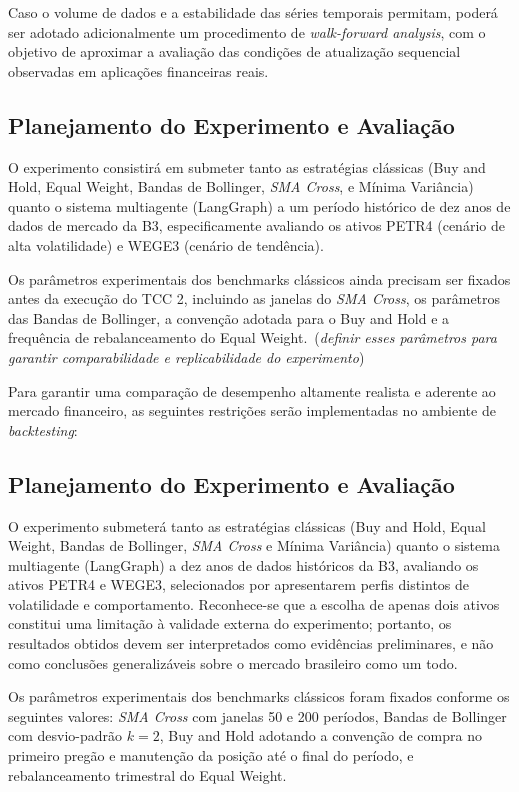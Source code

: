 \documentclass{eic-bcc-tcc}
\newcommand{\verify}[1]{{\color{blue} {#1}}}
\newcommand{\remarks}[2]{{\color{red} #1\ (\textit{#2})}}
\begin{document}
Caso o volume de dados e a estabilidade das séries temporais permitam, poderá ser adotado adicionalmente um procedimento de \textit{walk-forward analysis}, com o objetivo de aproximar a avaliação das condições de atualização sequencial observadas em aplicações financeiras reais.

\subsection{Planejamento do Experimento e Avaliação}

\verify{O experimento consistirá em submeter tanto as estratégias clássicas (Buy and Hold, Equal Weight, Bandas de Bollinger, \textit{SMA Cross}, e Mínima Variância) quanto o sistema multiagente (LangGraph) a um período histórico de dez anos de dados de mercado da B3, especificamente avaliando os ativos PETR4 (cenário de alta volatilidade) e WEGE3 (cenário de tendência).}

\remarks{Os parâmetros experimentais dos benchmarks clássicos ainda precisam ser fixados antes da execução do TCC 2, incluindo as janelas do \textit{SMA Cross}, os parâmetros das Bandas de Bollinger, a convenção adotada para o Buy and Hold e a frequência de rebalanceamento do Equal Weight.}{definir esses parâmetros para garantir comparabilidade e replicabilidade do experimento}

\verify{Para garantir uma comparação de desempenho altamente realista e aderente ao mercado financeiro, as seguintes restrições serão implementadas no ambiente de \textit{backtesting}:}

\subsection{Planejamento do Experimento e Avaliação}

O experimento submeterá tanto as estratégias clássicas (Buy and Hold, Equal Weight, Bandas de Bollinger, \textit{SMA Cross} e Mínima Variância) quanto o sistema multiagente (LangGraph) a dez anos de dados históricos da B3, avaliando os ativos PETR4 e WEGE3, selecionados por apresentarem perfis distintos de volatilidade e comportamento. Reconhece-se que a escolha de apenas dois ativos constitui uma limitação à validade externa do experimento; portanto, os resultados obtidos devem ser interpretados como evidências preliminares, e não como conclusões generalizáveis sobre o mercado brasileiro como um todo.

Os parâmetros experimentais dos benchmarks clássicos foram fixados conforme os seguintes valores: \textit{SMA Cross} com janelas 50 e 200 períodos, Bandas de Bollinger com desvio-padrão \(k = 2\), Buy and Hold adotando a convenção de compra no primeiro pregão e manutenção da posição até o final do período, e rebalanceamento trimestral do Equal Weight.
\end{document}
